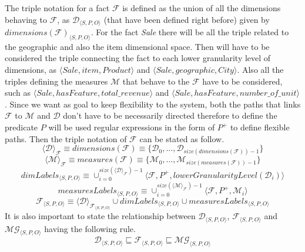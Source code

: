 \documentclass[12pt,a4paper]{report}
\newcommand\subject{S}
\newcommand\predicate{P}
\newcommand\object{O}
\newcommand\triple[1]{#1_{\set{\subject,\predicate,\object}}}
\newcommand\fact{\mathcal{F}}
\newcommand\dimension{\mathcal{D}}
\newcommand\measure{\mathcal{M}}
\newcommand\dimensions{dimensions}
\newcommand\multidimensionalGraph{\mathcal{MG}}
\newcommand\measures{measures}
\newcommand\set[1]{\langle #1 \rangle}
\begin{document}
The triple notation for a fact $\fact$ is defined as the union of all the dimensions behaving to $\fact$, as $\triple{\dimension}$ (that have been defined right before) given by $\triple{\dimensions(\fact)}$.
%
For the fact \textit{Sale} there will be all the triple related to the geographic and also the item dimensional space.
%
Then will have to be considered the triple connecting the fact to each lower granularity level of dimensions, as $\set{Sale,item,Product}$ and $\set{Sale,geographic,City}$.
%
Also all the triples defining the measures $\measure$ that behave to the $\fact$ have to be considered, such as $\set{Sale,hasFeature,total\_revenue}$ and $\set{Sale,hasFeature,number\_of\_unit}$.
%
Since we want as goal to keep flexibility to the system, both the paths that links $\fact$ to $\measure$ and $\dimension$ don't have to be necessarily directed therefore to define the predicate $\predicate$ will be used regular expressions in the form of $\predicate^{+}$ to define flexible paths.
%
Then the triple notation of $\fact$ can be stated as follow.
%
\begin{equation}
    \set{\dimension}_{\fact} \equiv \dimensions(\fact) \equiv \{\dimension_{0},...,\dimension_{size(\dimensions(\fact)) - 1}\}
\end{equation}
%
\begin{equation}
    \set{\measure}_{\fact} \equiv \measures(\fact) \equiv \{\measure_{0},...,\measure_{size(\measures(\fact)) - 1}\}
\end{equation}
%
\begin{equation}
    \triple{dimLabels} \equiv \cup_{i = 0}^{size(\set{\dimension}_{\fact}) - 1} \set{\fact,\predicate^{+},lowerGranularityLevel(\dimension_{i})}
\end{equation}
%
\begin{equation}
    \triple{measuresLabels} \equiv \cup_{i = 0}^{size(\set{\measure}_{\fact}) - 1} \set{\fact,\predicate^{+},\measure_{i}}
\end{equation}
%
\begin{equation}
    \triple{\fact} \equiv \triple{\set{\dimension}_{\fact}} \cup \triple{dimLabels} \cup \triple{measuresLabels}
\end{equation}
%
It is also important to state the relationship between $\triple{\dimension}$, $\triple{\fact}$ and $\triple{\multidimensionalGraph}$ having the following rule.
%
\begin{equation}
    \triple{\dimension} \sqsubseteq \triple{\fact} \sqsubseteq \triple{\multidimensionalGraph}
\end{equation}
\end{document}
